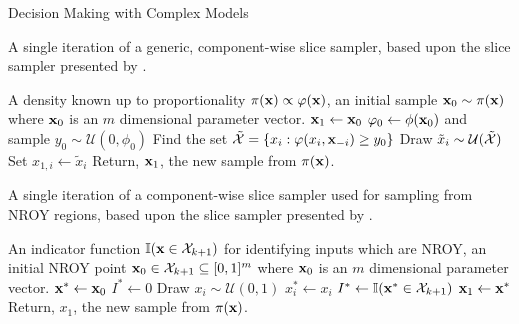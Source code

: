 \begin{chapter}{Decision Making with Complex Models \label{Chap:optimisation}}
\begin{figure}[h]
\end{figure}
\begin{algorithm}[h]
\caption{A single iteration of a generic, component-wise slice sampler, based upon the slice sampler presented by \citet{Neal2003}. \label{alg:neal-slice}}
\begin{algorithmic}
\Require A density known up to proportionality $\pi(\mathbf{x}) \propto \varphi(\mathbf{x})$, an initial sample $\mathbf{x}_0 \sim \pi(\mathbf{x})$ where $\mathbf{x}_0$ is an $m$ dimensional parameter vector.
\State $\mathbf{x}_1 \gets \mathbf{x}_0$
 \State $\varphi_0 \gets \phi(\mathbf{x}_0)$ and sample $y_0 \sim \mathcal{U}(0, \phi_0)$
 \State Find the set $\tilde{\mathcal{X}} = \{x_i : \varphi(x_i, \mathbf{x}_{-i}) \geq y_0 \}$
 \State Draw $\tilde{x}_i \sim \mathcal{U}(\tilde{\mathcal{X}})$
 \State Set $x_{1,i} \gets \tilde{x}_i$ 
\EndFor
\State Return, $\mathbf{x}_1$, the new sample from $\pi(\mathbf{x})$.
\end{algorithmic}
\end{algorithm}
\begin{algorithm}[h]
\caption{A single iteration of a component-wise slice sampler used for sampling from NROY regions, based upon the slice sampler presented by \citet{Andrianakis2017a}. \label{alg:nroy-slice}}
\begin{algorithmic}
\Require An indicator function $\mathbb{I}(\mathbf{x} \in \mathcal{X}_{k+1})$ for identifying inputs which are NROY, an initial NROY point $\mathbf{x}_0 \in \mathcal{X}_{k+1} \subseteq [0,1]^m$ where $\mathbf{x}_0$ is an $m$ dimensional parameter vector.
\State $\mathbf{x}^{*} \gets \mathbf{x}_0$
 \State $I^{*} \gets 0$ 
  \State Draw $x_i \sim \mathcal{U}(0,1)$ 
  \State $x^{*}_i \gets x_i$
  \State $I^{*} \gets \mathbb{I}(\mathbf{x}^{*} \in \mathcal{X}_{k+1})$ 
 \EndWhile
 \State $\mathbf{x}_1 \gets \mathbf{x}^{*}$ 
\EndFor
\State Return, $x_1$, the new sample from $\pi(\mathbf{x})$.
\end{algorithmic}
\end{algorithm}


\end{chapter}

